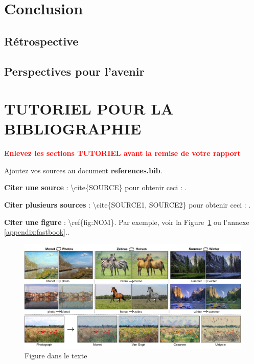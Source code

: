 \documentclass[12pt]{article} 	%
\begin{document}
\newpage
\section{Conclusion}

\subsection{Rétrospective}

\subsection{Perspectives pour l'avenir}


\section{TUTORIEL POUR LA BIBLIOGRAPHIE}

\textbf{
    \textcolor{red}{
        Enlevez les sections TUTORIEL avant la remise de votre rapport
    }
}

Ajoutez vos sources au document \textbf{references.bib}.

\textbf{Citer une source} : \textbackslash cite\{SOURCE\} pour obtenir ceci :
\cite{howard2020deep}.

\textbf{Citer plusieurs sources} : \textbackslash cite\{SOURCE1, SOURCE2\} pour
obtenir ceci : \cite{goodfellow2014generative, CycleGAN2017}.

\textbf{Citer une figure} : \textbackslash ref\{fig:NOM\}. Par exemple, voir la
Figure~\ref{fig:gan} ou l'annexe \ref{appendix:fastbook}..

\begin{figure}[h!]
    \begin{center}
        \includegraphics[scale=0.4]{img/gan_img.jpg}
    \end{center}
    \caption{Figure dans le texte~\cite{CycleGAN2017}}
    \label{fig:gan}
\end{figure}
\end{document}
